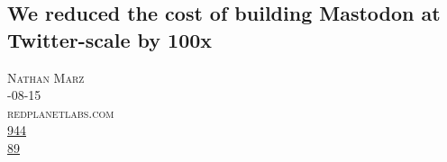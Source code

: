 \documentclass[10pt,a4paper]{article}
\begin{document}
\subsection{We reduced the cost of building Mastodon at Twitter-scale by 100x}
\noindent\begin{minipage}[t]{0.20\linewidth}
\vspace{0pt}
\noindent\textsc{\footnotesize
{\scriptsize\faUser}\space 
Nathan Marz \\
{\scriptsize\faCalendar}-08-15 \\
{\scriptsize\faGlobe}\space 
redplanetlabs.com \\
{\scriptsize\faThumbsOUp}\space 
\href{http://news.ycombinator.com/item?id=37137110\&utm\_term=comment}{944} \\
{\scriptsize\faComments}\space 
\href{http://news.ycombinator.com/item?id=37137110\&utm\_term=comment}{89} \\
}
\end{minipage} %
\end{document}
